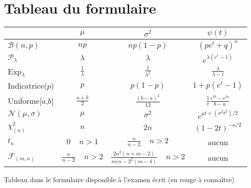 \section{Tableau du formulaire}

\newcommand{\important}[1]{\textcolor[rgb]{1,0,0}{#1}} %

\begin{center}
\begin{tabular}{|l|c|c|c|}

    \hline
                              & $\mu$                           & $\sigma^2$                                      & $\psi(t)$ \\
    \hline
    $\mathcal{B}(n,p)$        & \important{$np$}                & \important{$np(1-p)$}                           & $(pe^t+q)^n$ \\
    \hline
    $\mathcal{P}_\lambda$     & \important{$\lambda$}           & \important{$\lambda$}                           & $e^{\lambda(e^t-1)}$ \\
    \hline
    Exp$_\lambda$             & \important{$\frac{1}{\lambda}$} & $\frac{1}{\lambda^2}$                           & $\frac{\lambda}{\lambda-t}$ \\
    \hline
    Indicatrice($p$)          & \important{$p$}                 & \important{$p(1-p)$}                            & $1+p(e^t-1)$\\
    \hline
    Uniforme[$a$,$b$]         & \important{$\frac{a+b}{2}$}     & $\frac{(b-a)^2}{12}$                            & $\frac{1}{t}\frac{e^{tb}-e^{ta}}{b-a}$\\
    \hline
    $\mathcal{N}(\mu,\sigma)$ & \important{$\mu$}               & \important{$\sigma^2$}                          & $e^{\mu t+(\sigma^2t^2)/2}$\\
    \hline
    $\chi^2_{(n)}$            & \important{$n$}                 & $2n$                                            & $(1-2t)^{-n/2}$\\
    \hline
    $t_n$                     & \important{$0\ \ \ \ \ n>1$}    & $\frac{n}{n-2}\ \ \ \ \ n>2$                    & \important{aucun}\\
    \hline
    $\mathcal{F}_{(m,n)}$     & $\frac{n}{n-2}\ \ \ \ \ n>2$    & $\frac{2n^2(n+m-2)}{m(n-2^2(m-4)}\ \ \ \ \ n>2$ & \important{aucun}\\
    \hline

\end{tabular}

Tableau dans le formulaire disponible à l'examen écrit (\important{en rouge à connaître})
\end{center}


